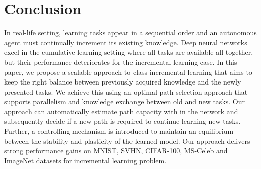 \section{Conclusion}
In real-life setting, learning tasks appear in a sequential order and an autonomous agent must continually increment its existing knowledge. Deep neural networks excel in the cumulative learning setting where all tasks are available all together, but their performance deteriorates for the incremental learning case. In this paper, we propose a scalable approach to class-incremental learning that aims to keep the right balance between previously acquired knowledge and the newly presented tasks. We achieve this using an optimal path selection approach that supports parallelism and knowledge exchange between old and new tasks. Our approach can automatically estimate path capacity with in the network and subsequently decide if a new path is required to continue learning new tasks. Further, a controlling mechanism is introduced to maintain an equilibrium between the stability and plasticity of the learned model. Our approach delivers strong performance gains on MNIST, SVHN, CIFAR-100, MS-Celeb and ImageNet datasets for incremental learning problem.